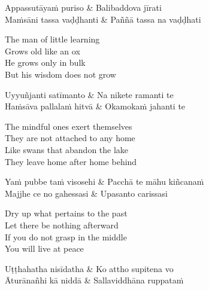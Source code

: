 
\begin{twochants}
  Appassutāyaṁ puriso & Balibaddova jīrati\\
  Maṁsāni tassa vaḍḍhanti & Paññā tassa na vaḍḍhati\\
\end{twochants}

\begin{english}
  The man of little learning\\
  Grows old like an ox\\
  He grows only in bulk\\
  But his wisdom does not grow
\end{english}


\begin{twochants}
  Uyyuñjanti satīmanto & Na nikete ramanti te\\
  Haṁsāva pallalaṁ hitvā & Okamokaṁ jahanti te\\
\end{twochants}

\begin{english}
  The mindful ones exert themselves\\
  They are not attached to any home\\
  Like swans that abandon the lake\\
  They leave home after home behind
\end{english}


\begin{twochants}
  Yaṁ pubbe taṁ visosehi & Pacchā te māhu kiñcanaṁ\\
  Majjhe ce no gahessasi & Upasanto carissasi\\
\end{twochants}

\begin{english}
  Dry up what pertains to the past\\
  Let there be nothing afterward\\
  If you do not grasp in the middle\\
  You will live at peace
\end{english}


\begin{twochants}
  Uṭṭhahatha nisīdatha & Ko attho supitena vo\\
  Āturānañhi kā niddā & Sallaviddhāna ruppataṁ\\
\end{twochants}

